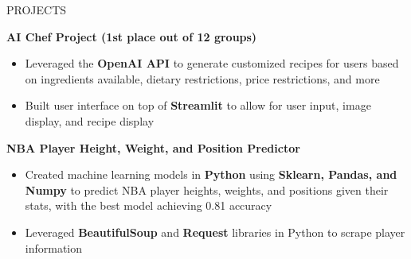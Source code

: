 \documentclass{resume} %
\begin{document}
\begin{rSection}{PROJECTS}

\textbf{AI Chef Project (1st place out of 12 groups)} \hfill %
\vspace{-6pt}
 \begin{itemize}[leftmargin=*]
    \itemsep -6pt {} 
     \item Leveraged the \textbf{OpenAI API} to generate customized recipes for users based on ingredients available, dietary restrictions, price restrictions, and more
     \item Built user interface on top of \textbf{Streamlit} to allow for user input, image display, and recipe display
 \end{itemize}

\textbf{NBA Player Height, Weight, and Position Predictor} %
\vspace{-6pt}
 \begin{itemize}[leftmargin=*]
    \itemsep -6pt {} 
     \item Created machine learning models in \textbf{Python} using \textbf{Sklearn, Pandas, and Numpy} to predict NBA player heights, weights, and positions given their stats, with the best model achieving 0.81 accuracy
     \item Leveraged \textbf{BeautifulSoup} and \textbf{Request} libraries in Python to scrape player information
 \end{itemize}


%
 

\end{rSection}
\end{document}
